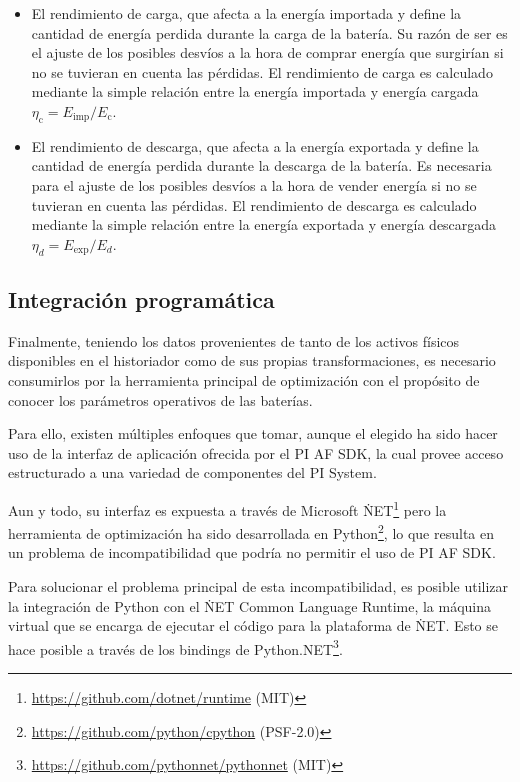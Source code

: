 \begin{itemize}

  \item El rendimiento de carga, que afecta a la energía importada y define la cantidad de energía perdida durante la carga de la batería. Su razón de ser es el ajuste de los posibles desvíos a la hora de comprar energía que surgirían si no se tuvieran en cuenta las pérdidas. El rendimiento de carga es calculado mediante la simple relación entre la energía importada y energía cargada \( \eta_{\text{c}} = E_{\text{imp}} / E_{\text{c}} \).

  \item El rendimiento de descarga, que afecta a la energía exportada y define la cantidad de energía perdida durante la descarga de la batería. Es necesaria para el ajuste de los posibles desvíos a la hora de vender energía si no se tuvieran en cuenta las pérdidas. El rendimiento de descarga es calculado mediante la simple relación entre la energía exportada y energía descargada \( \eta_{d} = E_{\text{exp}} / E_{d} \).

\end{itemize}

\subsection{Integración programática}%
\label{makereference3.5.2}

Finalmente, teniendo los datos provenientes de tanto de los activos físicos disponibles en el historiador como de sus propias transformaciones, es necesario consumirlos por la herramienta principal de optimización con el propósito de conocer los parámetros operativos de las baterías.

Para ello, existen múltiples enfoques que tomar, aunque el elegido ha sido hacer uso de la interfaz de aplicación ofrecida por el PI AF SDK, la cual provee acceso estructurado a una variedad de componentes del PI System.

Aun y todo, su interfaz es expuesta a través de Microsoft \.NET\footnote{\url{https://github.com/dotnet/runtime} (MIT)} pero la herramienta de optimización ha sido desarrollada en Python\footnote{\url{https://github.com/python/cpython} (PSF-2.0)}, lo que resulta en un problema de incompatibilidad que podría no permitir el uso de PI AF SDK\@.

Para solucionar el problema principal de esta incompatibilidad, es posible utilizar la integración de Python con el \.NET Common Language Runtime, la máquina virtual que se encarga de ejecutar el código para la plataforma de \.NET\@. Esto se hace posible a través de los bindings de Python.NET\footnote{\url{https://github.com/pythonnet/pythonnet} (MIT)}\@.

